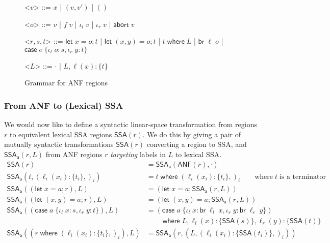 \documentclass[acmsmall,screen,review]{acmart}
\newcommand{\ms}[1]{\ensuremath{\mathsf{#1}}}
\newcommand{\lto}{:}
\newcommand{\linl}[1]{\iota_l\;{#1}}
\newcommand{\linr}[1]{\iota_r\;{#1}}
\newcommand{\labort}[1]{\ms{abort}\;{#1}}
\newcommand{\letstmt}[3]{\ensuremath{\ms{let}\;#1 = #2; #3}}
\newcommand{\brb}[2]{\ms{br}\;#1\;#2}
\newcommand{\casestmt}[5]{\ms{case}\;#1\;\{\linl{#2} \lto #3, \linr{#4} \lto #5\}}
\newcommand{\where}[2]{#1\;\ms{where}\;#2}
\newcommand{\wbranch}[3]{#1(#2) \lto \{#3\}}
\newcommand{\toanf}[1]{\ms{ANF}(#1)}
\newcommand{\tossa}[1]{\ms{SSA}(#1)}
\newcommand{\ssawhere}[2]{\ms{SSA}_{\ms{a}}(#1, #2)}
\begin{document}
\begin{figure}
  \begin{center}
    \begin{grammar}
      <\(v\)> ::= \(x\) \;|\; \((v, v')\) \;|\; \(()\)

      <\(o\)> ::= \(v\) \;|\; \(f\;v\) \;|\; \(\linl{v}\) \;|\; \(\linr{v}\) \;|\; \(\labort{v}\)

      <\(r, s, t\)> ::= 
      \(\letstmt{x}{o}{t}\)
      \;|\; \(\letstmt{(x, y)}{o}{t}\)
      \;|\; \(\where{t}{L}\)
      \;|\; \(\brb{\ell}{o}\)
      \;|\; \(\casestmt{e}{o}{s}{y}{t}\)

      <\(L\)> ::= \(\cdot\) \;|\; \(L, \wbranch{\ell}{x}{t}\)
    \end{grammar}
  \end{center}
  \caption{Grammar for ANF regions}
  \Description{}
  \label{fig:anf-grammar}
\end{figure}

\subsubsection{From ANF to (Lexical) SSA}

We would now like to define a syntactic linear-space transformation from regions $r$ to equivalent lexical SSA
regions $\tossa{r}$. We do this by giving a pair of mutually syntactic transformations $\tossa{r}$
converting a region to SSA, and $\ssawhere{r}{L}$
from ANF regions $r$ \emph{targeting} labels in $L$ to lexical SSA.
\begin{equation}
  \begin{aligned}
    \tossa{r} & = \ssawhere{\toanf{r}}{\cdot} \\[1em]
    \ssawhere{t}{(\wbranch{\ell_i}{x_i}{t_i},)_i} 
      &= \where{t}{(\wbranch{\ell_i}{x_i}{t_i},)_i} \qquad \text{where}\;t\;\text{is a terminator}
      \\
    \ssawhere{(\letstmt{x}{a}{r})}{L} &= (\letstmt{x}{a}{\ssawhere{r}{L}}) \\
    \ssawhere{(\letstmt{(x, y)}{a}{r})}{L} &= (\letstmt{(x, y)}{a}{\ssawhere{r}{L}}) \\
    \ssawhere{(\casestmt{a}{x}{s}{y}{t})}{L} &=
     \where{(\casestmt{a}{x}{\brb{\ell_l}{x}}{y}
                    {\brb{\ell_r}{y}})  \\ & \qquad }
                    {L, \wbranch{\ell_l}{x}{\tossa{s}}, \wbranch{\ell_r}{y}{\tossa{t}}} \\
    \ssawhere{(\where{r}{(\wbranch{\ell_i}{x_i}{t_i},)_i})}{L} 
      &= \ssawhere{r}{(L, (\wbranch{\ell_i}{x_i}{\tossa{t_i}},)_i)}
  \end{aligned}
\end{equation}
\end{document}

